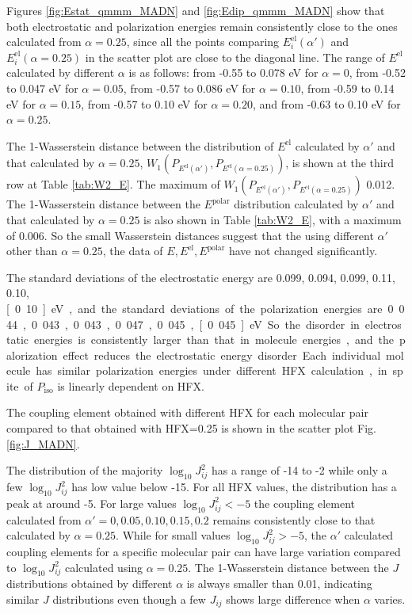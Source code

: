 \documentclass[%
 reprint,
 amsmath,amssymb,
 aps,
]{revtex4-2}
\begin{document}
Figures \ref{fig:Estat_qmmm_MADN} and \ref{fig:Edip_qmmm_MADN} show that both electrostatic and polarization energies remain consistently close to the ones calculated from $\alpha=0.25$, since all the points comparing $E^\text{el}_i(\alpha')$ and $E^\text{el}_i(\alpha=0.25)$ in the scatter plot are close to the diagonal line.
The range of $E^\text{el}$ calculated by different $\alpha$ is as follows:
from  -0.55 to 0.078 eV for $\alpha=0$, 
from  -0.52 to 0.047 eV for $\alpha=0.05$, 
from  -0.57 to 0.086 eV for $\alpha=0.10$, 
from  -0.59 to 0.14 eV for $\alpha=0.15$, 
from  -0.57 to 0.10 eV for $\alpha=0.20$, 
and from -0.63 to 0.10 eV for $\alpha=0.25$.


The 1-Wasserstein distance between the distribution of $E^\text{el}$ calculated by $\alpha'$ and that calculated by $\alpha=0.25$, $W_1(P_{E^\text{el}(\alpha')}, P_{E^\text{el}(\alpha=0.25)})$, is shown at the third row at Table \ref{tab:W2_E}. 
The maximum of $W_1(P_{E^\text{el}(\alpha')}, P_{E^\text{el}(\alpha=0.25)})$ 0.012. The 1-Wasserstein distance between the $E^\text{polar}$ distribution calculated by $\alpha'$ and that calculated by $\alpha=0.25$ is also shown in Table \ref{tab:W2_E}, with a maximum of 0.006. So the small Wasserstein distances suggest that the using different $\alpha'$ other than $\alpha=0.25$, the data of $E, E^\text{el}, E^\text{polar}$ have not changed significantly.

The standard deviations of the electrostatic energy are 0.099, 0.094, 0.099, 0.11, 0.10, \unit[0.10]{eV}, and the standard deviations of the polarization energies are 0.044, 0.043, 0.043, 0.047, 0.045, \unit[0.045]{eV}. So the disorder in electrostatic energies is consistently larger than that in molecule energies, and the palorization effect reduces the electrostatic energy disorder. 
Each individual molecule has similar polarization energies under different HFX calculation, in spite of $P_\text{iso}$ is linearly dependent on HFX. 

The coupling element obtained with different HFX for each molecular pair compared to that obtained with HFX=0.25 is shown in the scatter plot Fig. \ref{fig:J_MADN}.


The distribution of the majority $\log_{10} J_{ij}^2$ has a range of -14 to -2 while only a few $\log_{10} J_{ij}^2$ has low value below -15. For all HFX values, the distribution has a peak at around -5. 
For large values $\log_{10} J_{ij}^2 < -5$ the coupling element calculated from $\alpha'=0, 0.05, 0.10, 0.15, 0.2$ remains consistently close to that calculated by $\alpha=0.25$. While for small values $\log_{10} J_{ij}^2 > -5$, the $\alpha'$ calculated coupling elements for a specific molecular pair can have large variation compared to $\log_{10} J_{ij}^2$ calculated using $\alpha=0.25$.
The 1-Wasserstein distance between the $J$ distributions obtained by different $\alpha$ is always smaller than 0.01,  
indicating similar $J$ distributions even though a few $J_{ij}$ shows large difference when $\alpha$ varies. 
\end{document}
